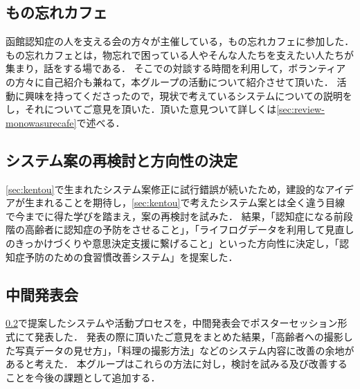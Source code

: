 \documentclass[../report]{subfiles}
\begin{document}
\subsection{もの忘れカフェ}
函館認知症の人を支える会の方々が主催している，もの忘れカフェに参加した．
もの忘れカフェとは，物忘れで困っている人やそんな人たちを支えたい人たちが集まり，話をする場である．
そこでの対談する時間を利用して，ボランティアの方々に自己紹介も兼ねて，本グループの活動について紹介させて頂いた．
活動に興味を持ってくださったので，現状で考えているシステムについての説明をし，それについてご意見を頂いた．頂いた意見ついて詳しくは\ref{sec:review-monowasurecafe}で述べる．

\subsection{システム案の再検討と方向性の決定}\label{sec:saikentou}
\ref{sec:kentou}で生まれたシステム案修正に試行錯誤が続いたため，建設的なアイデアが生まれることを期待し，\ref{sec:kentou}で考えたシステム案とは全く違う目線で今までに得た学びを踏まえ，案の再検討を試みた．
結果，「認知症になる前段階の高齢者に認知症の予防をさせること」，「ライフログデータを利用して見直しのきっかけづくりや意思決定支援に繋げること」といった方向性に決定し，「認知症予防のための食習慣改善システム」を提案した．

\subsection{中間発表会}
\ref{sec:saikentou}で提案したシステムや活動プロセスを，中間発表会でポスターセッション形式にて発表した．
発表の際に頂いたご意見をまとめた結果，「高齢者への撮影した写真データの見せ方」，「料理の撮影方法」などのシステム内容に改善の余地があると考えた．
本グループはこれらの方法に対し，検討を試みる及び改善することを今後の課題として追加する．
\end{document}
